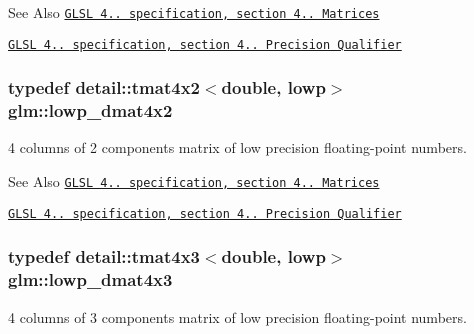 \begin{DoxySeeAlso}{See Also}
\href{http://www.opengl.org/registry/doc/GLSLangSpec.4.20.8.pdf}{\tt G\-L\-S\-L 4.. specification, section 4.. Matrices} 

\href{http://www.opengl.org/registry/doc/GLSLangSpec.4.20.8.pdf}{\tt G\-L\-S\-L 4.. specification, section 4.. Precision Qualifier} 
\end{DoxySeeAlso}
\hypertarget{group__core__precision_ga28a7ef670069c3707f19b9de1039517e}{
\subsubsection[{lowp\-\_\-dmat4x2}]{\setlength{\rightskip}{0pt plus 5cm}typedef detail\-::tmat4x2$<$double, lowp$>$ {\bf glm\-::lowp\-\_\-dmat4x2}}}\label{group__core__precision_ga28a7ef670069c3707f19b9de1039517e}
4 columns of 2 components matrix of low precision floating-\/point numbers.

\begin{DoxySeeAlso}{See Also}
\href{http://www.opengl.org/registry/doc/GLSLangSpec.4.20.8.pdf}{\tt G\-L\-S\-L 4.. specification, section 4.. Matrices} 

\href{http://www.opengl.org/registry/doc/GLSLangSpec.4.20.8.pdf}{\tt G\-L\-S\-L 4.. specification, section 4.. Precision Qualifier} 
\end{DoxySeeAlso}
\hypertarget{group__core__precision_gabc1be51eb0cae7cd4b1d6483a954c35d}{
\subsubsection[{lowp\-\_\-dmat4x3}]{\setlength{\rightskip}{0pt plus 5cm}typedef detail\-::tmat4x3$<$double, lowp$>$ {\bf glm\-::lowp\-\_\-dmat4x3}}}\label{group__core__precision_gabc1be51eb0cae7cd4b1d6483a954c35d}
4 columns of 3 components matrix of low precision floating-\/point numbers.


